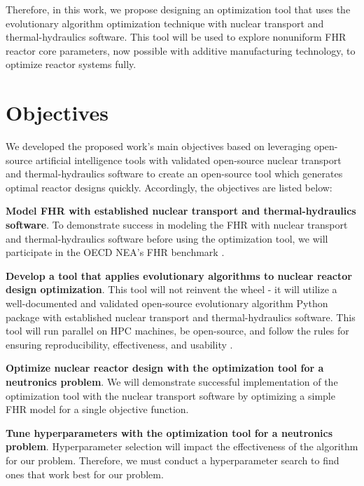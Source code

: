 Therefore, in this work, we propose designing an optimization tool that uses 
the evolutionary algorithm optimization technique with nuclear transport and 
thermal-hydraulics software. 
This tool will be used to explore nonuniform FHR reactor core parameters, now 
possible with additive manufacturing technology, to optimize reactor systems 
fully. 

\section{Objectives}
We developed the proposed work's main objectives based on leveraging 
open-source artificial intelligence tools with validated open-source nuclear 
transport and thermal-hydraulics software to create an open-source tool which 
generates optimal reactor designs quickly. 
Accordingly, the objectives are listed below:

\vspace{0.2cm} 
\noindent
\textbf{Model \gls{FHR} with established 
nuclear transport and thermal-hydraulics software}.
To demonstrate success in modeling the \gls{FHR} with nuclear transport and 
thermal-hydraulics software before using the optimization tool, we will 
participate in the \gls{OECD} \gls{NEA}'s \gls{FHR} benchmark 
\cite{noauthor_fluoride_nodate}. 

\vspace{0.2cm} 
\noindent
\textbf{Develop a tool that applies evolutionary algorithms to nuclear 
reactor design optimization}. 
This tool will not reinvent the wheel - it will utilize a well-documented 
and validated open-source evolutionary algorithm Python package with established 
nuclear transport and thermal-hydraulics software. This tool will run parallel on 
\gls{HPC} machines, be open-source, and follow the rules for ensuring 
reproducibility, effectiveness, and usability 
\cite{list_ten_2017,osborne_ten_2014,sandve_ten_2013}. 

\vspace{0.2cm} 
\noindent
\textbf{Optimize nuclear reactor design with the optimization tool 
for a neutronics problem}. 
We will demonstrate successful implementation of the optimization tool with the 
nuclear transport software by optimizing a simple \gls{FHR} model for a single 
objective function. 

\vspace{0.2cm} 
\noindent
\textbf{Tune hyperparameters with the optimization tool for a neutronics problem}.
Hyperparameter selection will impact the effectiveness of the algorithm 
for our problem. 
Therefore, we must conduct a hyperparameter search to find ones that work best 
for our problem. 

